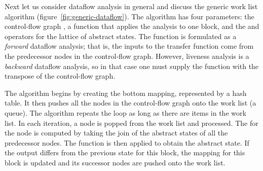 \documentclass[7x10]{TimesAPriori_MIT}%
\numberwithin{theorem}{chapter}
\numberwithin{definition}{chapter}
\numberwithin{equation}{chapter}
\begin{document}
Next let us consider dataflow analysis in general and discuss the
generic work list algorithm (figure~\ref{fig:generic-dataflow}). 
%
The algorithm has four parameters: the control-flow graph , a
function  that applies the analysis to one block, and the
 and  operators for the lattice of abstract
states. The  function is formulated as a
\emph{forward} dataflow analysis; that is, the inputs to the transfer
function come from the predecessor nodes in the control-flow
graph. However, liveness analysis is a \emph{backward} dataflow
analysis, so in that case one must supply the 
function with the transpose of the control-flow graph.

The algorithm begins by creating the bottom mapping, represented by a
hash table.  It then pushes all the nodes in the control-flow graph
onto the work list (a queue). The algorithm repeats the 
loop as long as there are items in the work list. In each iteration, a
node is popped from the work list and processed. The  for
the node is computed by taking the join of the abstract states of all
the predecessor nodes. The  function is then applied to
obtain the  abstract state. If the output differs from
the previous state for this block, the mapping for this block is
updated and its successor nodes are pushed onto the work list.
\end{document}
